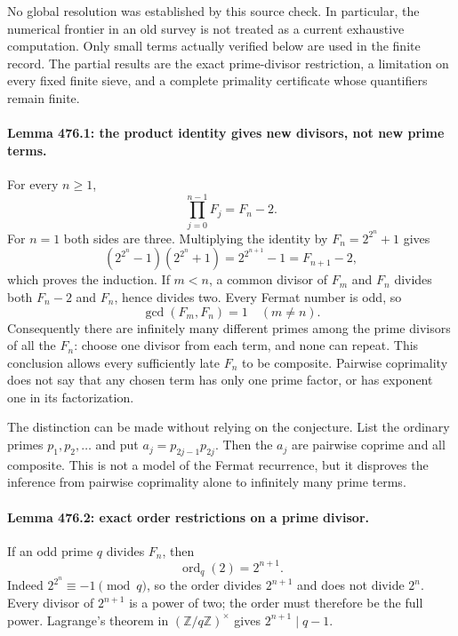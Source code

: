\documentclass[11pt]{article}
\begin{document}
No global resolution was established by this source check. In particular,
the numerical frontier in an old survey is not treated as a current
exhaustive computation. Only small terms actually verified below are
used in the finite record. The partial results are the exact prime-divisor
restriction, a limitation on every fixed finite sieve, and a complete
primality certificate whose quantifiers remain finite.

\paragraph{Lemma 476.1: the product identity gives new divisors, not new prime terms.}
For every $n\geq1$,
\begin{equation}\label{a476:product}
                  \prod_{j=0}^{n-1}F_j=F_n-2.
\end{equation}
For $n=1$ both sides are three. Multiplying the identity by
$F_n=2^{2^n}+1$ gives
\[
 (2^{2^n}-1)(2^{2^n}+1)=2^{2^{n+1}}-1=F_{n+1}-2,
\]
which proves the induction. If $m<n$, a common divisor of $F_m$ and
$F_n$ divides both $F_n-2$ and $F_n$, hence divides two. Every Fermat
number is odd, so
\begin{equation}\label{a476:coprime}
                         \gcd(F_m,F_n)=1\quad(m\ne n).
\end{equation}
Consequently there are infinitely many different primes among the prime
divisors of all the $F_n$: choose one divisor from each term, and none
can repeat. This conclusion allows every sufficiently late $F_n$ to be
composite. Pairwise coprimality does not say that any chosen term has
only one prime factor, or has exponent one in its factorization.

The distinction can be made without relying on the conjecture. List the
ordinary primes $p_1,p_2,\ldots$ and put $a_j=p_{2j-1}p_{2j}$.
Then the $a_j$ are pairwise coprime and all composite. This is not a
model of the Fermat recurrence, but it disproves the inference from
pairwise coprimality alone to infinitely many prime terms.

\paragraph{Lemma 476.2: exact order restrictions on a prime divisor.}
If an odd prime $q$ divides $F_n$, then
\begin{equation}\label{a476:order}
                         \operatorname{ord}_q(2)=2^{n+1}.
\end{equation}
Indeed $2^{2^n}\equiv-1\pmod q$, so the order divides $2^{n+1}$
and does not divide $2^n$. Every divisor of $2^{n+1}$ is a power of
two; the order must therefore be the full power. Lagrange's theorem in
$(\mathbb Z/q\mathbb Z)^\times$ gives $2^{n+1}\mid q-1$.
\end{document}
